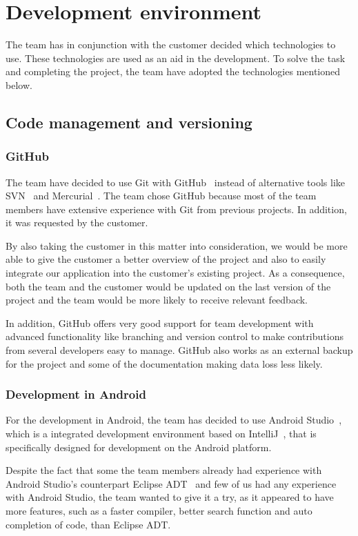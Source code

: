 \chapter{Development environment}

The team has in conjunction with the customer decided which technologies to use. These technologies are used as an aid in the development. To solve the task and completing the project, the team have adopted the technologies mentioned below.


\section{Code management and versioning}
\subsection{GitHub}
The team have decided to use Git with GitHub~\cite{github} instead of alternative tools like SVN~\cite{svn} and Mercurial~\cite{mercurial}. 
The team chose GitHub because most of the team members have extensive experience with Git from previous projects. In addition, it was requested by the customer. 

By also taking the customer in this matter into consideration, we would be more able to give the customer a better overview of the project and also to easily integrate our application into the customer's existing project. As a consequence, both the team and the customer would be updated on the last version of the project and the team would be more likely to receive relevant feedback. 

In addition, GitHub offers very good support for team development 
with advanced functionality like branching and version control to make contributions from several developers easy 
to manage. GitHub also works as an external backup for the project and some of the documentation making data loss less likely.

\subsection{Development in Android}
For the development in Android, the team has decided to use Android Studio~\cite{android-studio}, which is a integrated development environment based on IntelliJ~\cite{intellij}, that is specifically designed for development on the Android platform.

Despite the fact that some the team members already had experience with Android Studio's counterpart Eclipse ADT~\cite{eclipse} and few of us had any experience with Android Studio, the team wanted to give it a try, as it appeared to have more features, such as a faster compiler, better search function and auto completion of code, than Eclipse ADT. 

